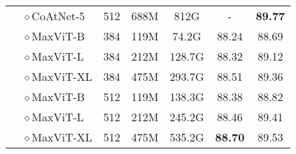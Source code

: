 \documentclass[runningheads]{llncs}
\begin{document}
\begin{table}[!ht]
\begin{tabular}{c|l|ccccc}
&\textcolor{darkgreen}{$\diamond$}CoAtNet-5~\cite{dai2021coatnet} & 512 & 688M & 812G & -  & \textbf{89.77} \\
\cmidrule(lr){2-7}
& \textcolor{darkgreen}{$\diamond$}MaxViT-B & 384 & 119M & 74.2G  & 88.24 & 88.69 \\
& \textcolor{darkgreen}{$\diamond$}MaxViT-L & 384 & 212M & 128.7G & 88.32 & 89.12 \\
& \textcolor{darkgreen}{$\diamond$}MaxViT-XL & 384 & 475M & 293.7G & 88.51 &  89.36 \\
\cmidrule(lr){2-7}
& \textcolor{darkgreen}{$\diamond$}MaxViT-B & 512 & 119M & 138.3G & 88.38 &  88.82 \\
& \textcolor{darkgreen}{$\diamond$}MaxViT-L & 512 &  212M & 245.2G & 88.46 &  89.41 \\
& \textcolor{darkgreen}{$\diamond$}MaxViT-XL & 512 & 475M & 535.2G & \textbf{88.70} & {89.53}  \\
\bottomrule
\end{tabular}
\end{table}
\end{document}
